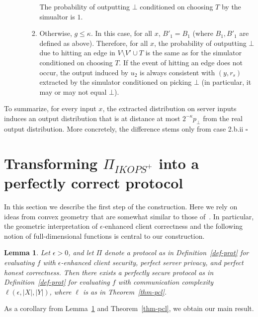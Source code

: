 \documentclass[a4paper]{article}
\newtheorem{lemma}[theorem]{Lemma}
\begin{document}
\begin{enumerate}
\begin{enumerate}
\begin{enumerate}
		The probability of outputting $\bot$ conditioned on choosing $T$ by the simualtor is $1$. 
		\item Otherwise, $g\leq \kappa$. In this case, for all $x$, $B'_1=B_1$ (where $B_1,B'_1$ are defined as above). Therefore, for all $x$, the probability of outputting $\bot$ due to hitting an edge in $V\setminus{V'}\cup T$ is the same as for the simulator conditioned on choosing $T$. If the event of hitting an edge does not occur, the output induced by $u_2$ is always consistent with $(y,r_s)$ extracted by the simulator conditioned on picking $\bot$ (in particular, it may or may not equal $\bot$). 
\end{enumerate}
 	\end{enumerate}
\end{enumerate}

To summarize, for every input $x$, the extracted distribution on server inputs induces an output distribution that is at distance at most $2^{-\kappa}p_\bot$ from the real output distribution. More concretely, the difference stems only from case 2.b.ii $\square$


\section{Transforming $\Pi_{IKOPS^+}$ into a perfectly correct protocol}

In this section we describe the first step of the construction.
Here we rely on ideas from convex geometry that are somewhat similar to those of~\cite{Ash14}. In particular, the geometric interpretation of $\epsilon$-enhanced client correctness and the following notion of full-dimensional functions is central to our construction.


\begin{lemma}\label{lem-tt-perfect}
	Let $\epsilon>0$, and let $\Pi$ denote a protocol as in Definition~\ref{def-prot} for evaluating $f$ with $\epsilon$-enhanced client security, perfect server privacy, and perfect honest correctness. Then there exists a perfectly secure protocol as in Definition~\ref{def-prot} for evaluating $f$ with communication complexity $\ell(\epsilon,|X|,|Y|)$, where $\ell$ is as in Theorem~\ref{thm-pcl}. 
\end{lemma}

As a corollary from Lemma~\ref{lem-tt-perfect} and Theorem~\ref{thm-pcl}, we obtain our main result.
\end{document}
